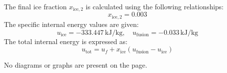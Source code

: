 The final ice fraction \( x_{\text{ice},2} \) is calculated using the following relationships:  
\[
x_{\text{ice},2} = 0.003
\]  
The specific internal energy values are given:  
\[
u_{\text{ice}} = -333.447 \, \text{kJ/kg}, \quad u_{\text{fusion}} = -0.033 \, \text{kJ/kg}
\]  
The total internal energy is expressed as:  
\[
u_{\text{tot}} = u_f + x_{\text{ice}} \left( u_{\text{fusion}} - u_{\text{ice}} \right)
\]  

No diagrams or graphs are present on the page.